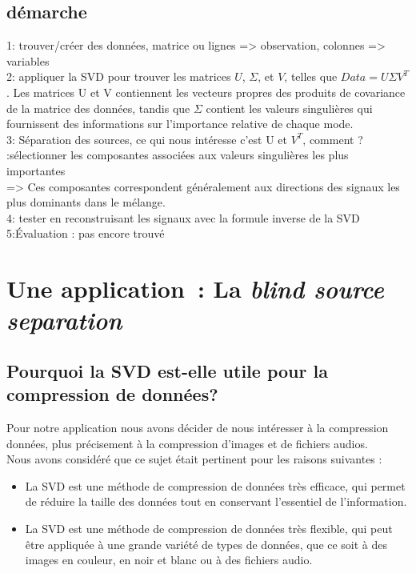 \documentclass[a4paper, 11pt]{article}
\begin{document}
\subsection*{démarche}
1: trouver/créer des données, matrice ou lignes => observation, colonnes => variables\\
2: appliquer la SVD pour trouver les matrices $U$, $\Sigma$, et $V$, telles que $Data =  U \Sigma V^T$.
Les matrices U et V contiennent les vecteurs propres des produits de covariance de la matrice des données,
tandis que $\Sigma$ contient les valeurs singulières qui fournissent des informations sur l'importance relative de chaque mode.\\
3: Séparation des sources, ce qui nous intéresse c'est U et $V^T$, comment ? :sélectionner les composantes associées aux valeurs singulières les plus importantes\\
=> Ces composantes correspondent généralement aux directions des signaux les plus dominants dans le mélange.\\
4: tester en reconstruisant les signaux avec la formule inverse de la SVD\\
5:Évaluation  : pas encore trouvé 


\section{Une application~: La \textit{blind source separation}}

\subsection{Pourquoi la SVD est-elle utile pour la compression de données?}
Pour notre application nous avons décider de nous intéresser à la compression données, plus précisement à la compression d'images et de fichiers audios.\\
Nous avons considéré que ce sujet était pertinent pour les raisons suivantes :\\
\begin{itemize}
    \item La SVD est une méthode de compression de données très efficace, qui permet de réduire la taille des données tout en conservant l'essentiel de l'information.\\
    \item La SVD est une méthode de compression de données très flexible, qui peut être appliquée à une grande variété de types de données, que ce soit à des images en couleur, en noir et blanc ou à des fichiers audio.\\
\end{itemize}
\end{document}
